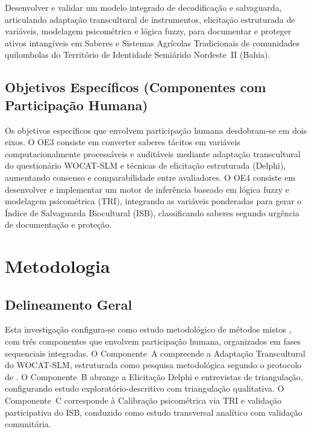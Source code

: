 \documentclass[12pt,a4paper,brazil]{article}
\begin{document}
Desenvolver e validar um modelo integrado de decodificação e salvaguarda, articulando adaptação transcultural de instrumentos, elicitação estruturada de variáveis, modelagem psicométrica e lógica fuzzy, para documentar e proteger ativos intangíveis em Saberes e Sistemas Agrícolas Tradicionais de comunidades quilombolas do Território de Identidade Semiárido Nordeste~II (Bahia).

\subsection{Objetivos Específicos (Componentes com Participação Humana)}

Os objetivos específicos que envolvem participação humana desdobram-se em dois eixos. O OE3 consiste em converter saberes tácitos em variáveis computacionalmente processáveis e auditáveis mediante adaptação transcultural do questionário WOCAT-SLM e técnicas de elicitação estruturada (Delphi), aumentando consenso e comparabilidade entre avaliadores. O OE4 consiste em desenvolver e implementar um motor de inferência baseado em lógica fuzzy e modelagem psicométrica (TRI), integrando as variáveis ponderadas para gerar o Índice de Salvaguarda Biocultural (ISB), classificando saberes segundo urgência de documentação e proteção.


\section{Metodologia}

\subsection{Delineamento Geral}

Esta investigação configura-se como estudo metodológico de métodos mistos \citep{Creswell2018}, com três componentes que envolvem participação humana, organizados em fases sequenciais integradas. O Componente~A compreende a Adaptação Transcultural do WOCAT-SLM, estruturada como pesquisa metodológica segundo o protocolo de \citet{Beaton2000}. O Componente~B abrange a Elicitação Delphi e entrevistas de triangulação, configurando estudo exploratório-descritivo com triangulação qualitativa. O Componente~C corresponde à Calibração psicométrica via TRI e validação participativa do ISB, conduzido como estudo transversal analítico com validação comunitária.
\end{document}
